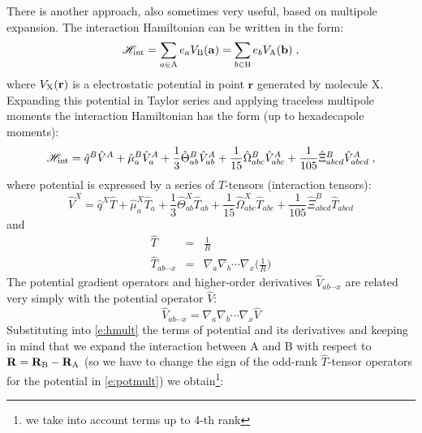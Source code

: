 \documentclass[a4paper,titlepage,twoside,fleqn]{article}
\begin{document}
There is another approach, also sometimes very useful, based on 
multipole expansion. The interaction Hamiltonian can be written
in the form:
\begin{equation}
\mathscr{H}_{\rm int} = \sum_{a\in {\rm A}} e_a V_{\rm B}(\mathbf a)  = \sum_{b\in {\rm B}} e_b V_{\rm A}(\mathbf b)\; ,
\end{equation}
where $V_{\rm X}(\mathbf r)$ is a electrostatic potential in point $\mathbf r$ 
generated by molecule X. Expanding this potential in Taylor series 
and applying traceless multipole moments the interaction Hamiltonian
has the form (up to hexadecapole moments):
\begin{equation}\label{e:hmult}
\mathscr{H}_{\rm int} = \hat{q}^B\hat{V}^A + \hat{\mu}^B_a\hat{V}^A_a + \frac{1}{3} \hat{\Theta}^B_{ab} \hat{V}^A_{ab} 
                + \frac{1}{15} \hat{\Omega}^B_{abc} \hat{V}^A_{abc} 
                + \frac{1}{105} \hat{\Xi}^B_{abcd} \hat{V}^A_{abcd} \; ,
\end{equation}
where potential is expressed by a series of $T$-tensors (interaction tensors):
\begin{equation}\label{e:potmult}
\hat{V}^X = \hat{q}^X \hat{T} + \hat{\mu}^X_a\hat{T}_a + \frac{1}{3} \hat{\Theta}^X_{ab}\hat{T}_{ab} 
                              + \frac{1}{15} \hat{\Omega}^X_{abc} \hat{T}_{abc} 
                              + \frac{1}{105} \hat{\Xi}^B_{abcd} \hat{T}_{abcd}
\end{equation}
and
\begin{eqnarray}
\hat{T}              &=& \frac{1}{R} \\
\hat{T}_{ab\cdots x} &=& \nabla_a\nabla_b\cdots\nabla_x \Big(\frac{1}{R}\Big) 
\end{eqnarray}
The potential gradient operators and higher-order derivatives $\hat{V}_{ab\cdots x}$
are related very simply with the potential operator $\hat{V}$:
\begin{equation}
\hat{V}_{ab\cdots x} = \nabla_a\nabla_b\cdots\nabla_x \hat{V} 
\end{equation}
Substituting into \ref{e:hmult} the terms of potential and its derivatives
and keeping in mind that we expand the interaction between A and B
with respect to ${\mathbf R} = {\mathbf R}_{\rm B} - {\mathbf R}_{\rm A}$
(so we have to change the sign of the odd-rank $\hat{T}$-tensor operators for the potential in \ref{e:potmult}) 
we obtain\footnote{we take into account terms up to 4-th rank}:
\end{document}
